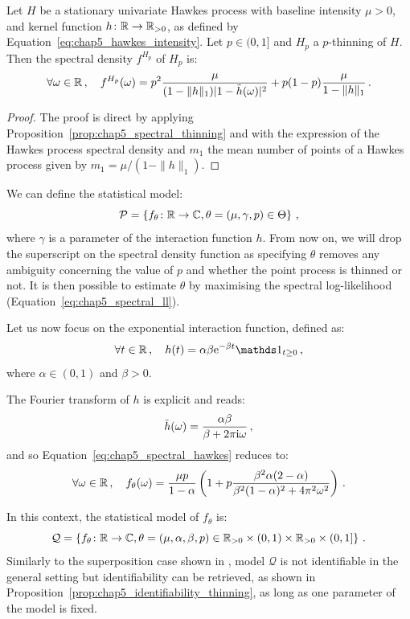     \begin{corollary}\label{cor:chap5_hawkes_thinning}
        Let $H$ be a stationary univariate Hawkes process with baseline intensity $\mu > 0$, and kernel function $h\colon {\mathbb R}\to {\mathbb R}_{>0}$,
        as defined by Equation~\eqref{eq:chap5_hawkes_intensity}. Let $p\in(0,1]$ and $H_p$ a $p$-thinning of $H$. 
        Then the spectral density $f^{H_p}$ of $H_p$ is:
        \begin{equation}\label{eq:chap5_spectral_hawkes}
            \forall \omega \in {\mathbb R}\,, \quad f^{H_p}(\omega) = p^2 \frac{\mu}{(1-\|h\|_1)|1-\tilde h(\omega)|^2} + p(1-p)\frac{\mu}{1-\|h\|_1}\,.
        \end{equation}
    \end{corollary}
    \begin{proof}
        The proof is direct by applying Proposition~\ref{prop:chap5_spectral_thinning} and 
        with the expression of the Hawkes process spectral density and $m_1$ the mean number of points of a Hawkes process given by $m_1 = \mu/(1-\|h\|_1)$.
    \end{proof}
    We can define the statistical model:
    \[\mathcal{P} = 
      \left\{
        f_\theta \colon {\mathbb R} \to {\mathbb C}, \theta = (\mu, \gamma, p) \in \Theta
      \right\}\,,
    \]
    where $\gamma$ is a parameter of the interaction function $h$.
    From now on, we will drop the superscript on the spectral density function as specifying $\theta$ removes any ambiguity concerning the value of $p$ and whether the point process is thinned or not.
    It is then possible to estimate $\theta$ by maximising the spectral log-likelihood (Equation~\eqref{eq:chap5_spectral_ll}).

    Let us now focus on the exponential interaction function, defined as:
    \[\forall t\in\RR\,,\quad h(t) = \alpha \beta \mathrm{e}^{-\beta t}\II_{t\geq 0}\,,\]
    where $\alpha \in(0,1)$ and $\beta > 0$.

    The Fourier transform of $h$ is explicit and reads:
    \[\tilde h (\omega) = \frac{\alpha \beta}{\beta + 2 \pi \mathrm{i} \omega}\,,\]
    and so Equation~\eqref{eq:chap5_spectral_hawkes} reduces to:
    \begin{equation}\label{eq:chap5_spectral_exponential}
        \forall \omega\in{\mathbb R}\,,\quad
        f_{\theta}(\omega) = \frac{\mu p }{1-\alpha}\left(1 + p \frac{\beta^2 \alpha (2-\alpha)}{\beta^2(1-\alpha)^2 + 4 \pi^2 \omega^2}\right)\,.
    \end{equation}

    In this context, the statistical model of $f_\theta$ is:
    \[\mathcal{Q} = 
      \left\{
        f_\theta \colon {\mathbb R} \to {\mathbb C}, 
        \theta = (\mu, \alpha, \beta, p) \in {\mathbb R}_{>0}\times (0,1) \times {\mathbb R}_{>0}\times(0,1]
      \right\}\,.
    \]
    Similarly to the superposition case shown in \textcite[Proposition 3.2]{Bonnet2024}, 
    model $\mathcal{Q}$ is not identifiable in the general setting but identifiability can be retrieved, as shown in Proposition~\ref{prop:chap5_identifiability_thinning}, as long as one parameter of the model is fixed.


